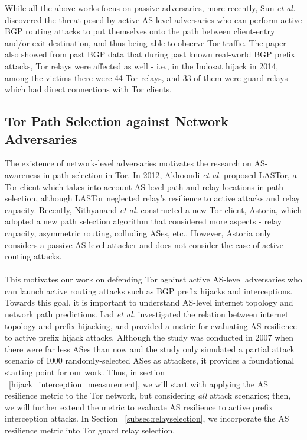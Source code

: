 While all the above works focus on passive adversaries, more recently, Sun \emph{et al.} ~\cite{sun2015raptor} discovered the threat posed by active AS-level adversaries who can perform active BGP routing attacks to put themselves onto the path between client-entry and/or exit-destination, and thus being able to observe Tor traffic. The paper also showed from past BGP data that during past known real-world BGP prefix attacks, Tor relays were affected as well - i.e., in the Indosat hijack in 2014, among the victims there were 44 Tor relays, and 33 of them were guard relays which had direct connections with Tor clients. 

\subsection{Tor Path Selection against Network Adversaries}
The existence of network-level adversaries motivates the research on AS-awareness in path selection in Tor. In 2012, Akhoondi \emph{et al.} \cite{akhoondi2012lastor} proposed LASTor, a Tor client which takes into account AS-level path and relay locations in path selection, although LASTor neglected relay's resilience to active attacks and relay capacity. Recently, Nithyanand \emph{et al.} \cite{starov2015measuring} constructed a new Tor client, Astoria, which adopted a new path selection algorithm that considered more aspects - relay capacity, asymmetric routing, colluding ASes, etc.. However, Astoria only considers a passive AS-level attacker and does not consider the case of active routing attacks.\\
\\
This motivates our work on defending Tor against active AS-level adversaries who can launch active routing attacks such as BGP prefix hijacks and interceptions. Towards this goal, it is important to understand AS-level internet topology and network path predictions. Lad \emph{et al.} \cite{lad2007understanding} investigated the relation between internet topology and prefix hijacking, and provided a metric for evaluating AS resilience to active prefix hijack attacks. Although the study was conducted in 2007 when there were far less ASes than now and the study only simulated a partial attack scenario of 1000 randomly-selected ASes as attackers, it provides a foundational starting point for our work. Thus, in section ~\ref{hijack_interception_measurement}, we will start with applying the AS resilience metric to the Tor network, but considering \emph{all} attack scenarios; then, we will further extend the metric to evaluate AS resilience to active prefix interception attacks. In Section ~\ref{subsec:relayselection}, we incorporate the AS resilience metric into Tor guard relay selection. 


